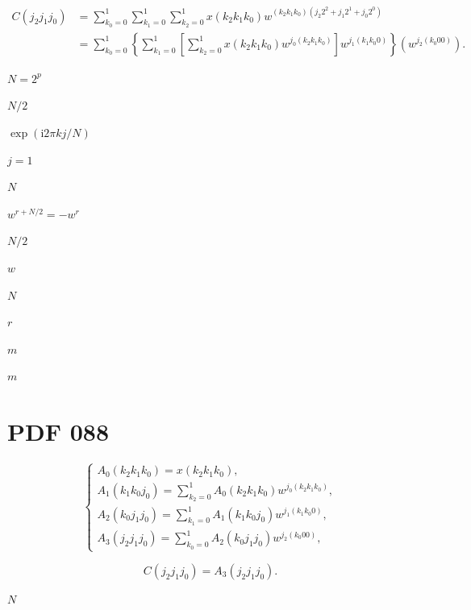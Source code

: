 \documentclass[UTF8,fontset=fandol,a4paper]{ctexart}
\begin{document}
\[
\begin{aligned}
C(j_2j_1j_0)&=\sum_{k_0=0}^1\sum_{k_1=0}^1\sum_{k_2=0}^1x(k_2k_1k_0)w^{(k_2k_1k_0)(j_2 2^2+j_1 2^1+j_0 2^0)}\\
&=\sum_{k_0=0}^1\left\{\sum_{k_1=0}^1\left[\sum_{k_2=0}^1x(k_2k_1k_0)w^{j_0(k_2k_1k_0)}\right]w^{j_1(k_1k_0 0)}\right\}\left(w^{j_2(k_0 00)}\right).
\end{aligned}\tag{3.7.11}
\]

\noindent $N=2^p$\par

\noindent $N/2$\par

\noindent $\exp(\mathrm i2\pi kj/N)$\par

\noindent $j=1$\par

\noindent $N$\par

\noindent $w^{r+N/2}=-w^r$\par

\noindent $N/2$\par

\noindent $w$\par

\noindent $N$\par

\noindent $r$\par

\noindent $m$\par

\noindent $m$\par

\section*{PDF 088}

\[
\begin{cases}
A_0(k_2k_1k_0)=x(k_2k_1k_0),\\[4pt]
A_1(k_1k_0j_0)=\displaystyle\sum_{k_2=0}^1A_0(k_2k_1k_0)w^{j_0(k_2k_1k_0)},\\[4pt]
A_2(k_0j_1j_0)=\displaystyle\sum_{k_1=0}^1A_1(k_1k_0j_0)w^{j_1(k_1k_0 0)},\\[4pt]
A_3(j_2j_1j_0)=\displaystyle\sum_{k_0=0}^1A_2(k_0j_1j_0)w^{j_2(k_0 00)},
\end{cases}\tag{3.7.12}
\]

\[
C(j_2j_1j_0)=A_3(j_2j_1j_0).
\]

\noindent $N$\par
\end{document}
